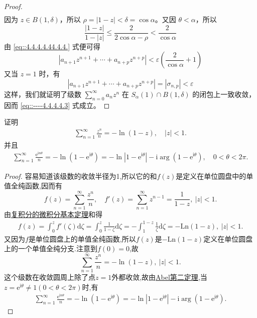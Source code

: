 \documentclass[../../main.tex]{subfiles}%
\begin{document}
\begin{proof}
\[\begin{aligned}
\end{aligned}
\]
因为 \( z \in B(1, \delta) \)，所以 \( \rho = |1 - z| < \delta = \cos\alpha \)。又因 \( \theta < \alpha \)，所以
\[
\frac{|1 - z|}{1 - |z|} \leqslant  \frac{2}{2\cos\alpha - \rho} < \frac{2}{\cos\alpha}
\]
由 \eqref{eq::4.4.4.4.44.4.4.} 式便可得
\[
|a_{n+1} z^{n+1} + \cdots + a_{n+p} z^{n+p}| < \varepsilon \left( \frac{2}{\cos\alpha} + 1 \right)
\]
又当 \( z = 1 \) 时，有
\[
|a_{n+1} z^{n+1} + \cdots + a_{n+p} z^{n+p}| = |\sigma_{n,p}| < \varepsilon
\]
这样，我们就证明了级数 \( \sum_{n=0}^{\infty} a_n z^n \) 在 \( S_{\alpha}(1) \cap B(1, \delta) \) 的闭包上一致收敛，因而 \eqref{eq::----4.4.4.4.3} 式成立。
\end{proof}

\begin{proposition}\label{proposition:4.2.10}
证明
\begin{align*}
\sum_{n=1}^{\infty} \frac{z^n}{n}=-\ln (1-z),\quad |z|<1.
\end{align*}
并且
\begin{align}
\sum_{n=1}^{\infty} \frac{\mathrm{e}^{\mathrm{i}n\theta}}{n} = -\ln(1 - \mathrm{e}^{\mathrm{i}\theta}) = -\ln|1 - \mathrm{e}^{\mathrm{i}\theta}| - \mathrm{i}\arg(1 - \mathrm{e}^{\mathrm{i}\theta}),\quad 0<\theta <2\pi. \label{eq:2-=------2}
\end{align}
\end{proposition}
\begin{proof}
容易知道该级数的收敛半径为1,所以它的和$f(z)$是定义在单位圆盘中的单值全纯函数,因而有
\[
f(z) = \sum_{n=1}^{\infty} \frac{z^n}{n},
\quad
f'(z) = \sum_{n=1}^{\infty} z^{n-1} = \frac{1}{1 - z},\ |z| < 1. 
\]
由\hyperref[theorem:复积分的微积分基本定理]{复积分的微积分基本定理}和得
\begin{align*}
f\left( z \right) =\int_0^z{f' \left( \zeta \right) \mathrm{d}\zeta}=\int_0^z{\frac{1}{1-\zeta}\mathrm{d}\zeta}=-\int_1^{1-z}{\frac{1}{\zeta}\mathrm{d}\zeta}=-\mathrm{Ln}\left( 1-z \right) ,\ |z| < 1. 
\end{align*}
又因为$f$是单位圆盘上的单值全纯函数,所以$f(z)$是$-\mathrm{Ln}\left( 1-z \right)$定义在单位圆盘上的一个单值全纯分支.注意到$f(0)=0$,故
\[
\sum_{n=1}^{\infty} \frac{z^n}{n} = -\ln(1 - z),\ |z| < 1. 
\]
这个级数在收敛圆周上除了点$z = 1$外都收敛,故由\hyperref[theorem:Abel第二定理]{Abel第二定理},当$z = \mathrm{e}^{\mathrm{i}\theta}\neq 1 (0 < \theta < 2\pi)$时,有
\begin{align*}
\sum_{n=1}^{\infty} \frac{\mathrm{e}^{\mathrm{i}n\theta}}{n} = -\ln(1 - \mathrm{e}^{\mathrm{i}\theta}) = -\ln|1 - \mathrm{e}^{\mathrm{i}\theta}| - \mathrm{i}\arg(1 - \mathrm{e}^{\mathrm{i}\theta}). 
\end{align*}
\end{proof}
\end{document}
